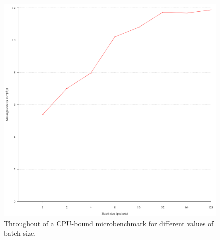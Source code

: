 \begin{figure}
\begin{centering}
\includegraphics{figs/batch.eps}
\caption{Throughout of a CPU-bound microbenchmark for different values of batch size.}
\label{fig:batch}
\end{centering}
\end{figure}

